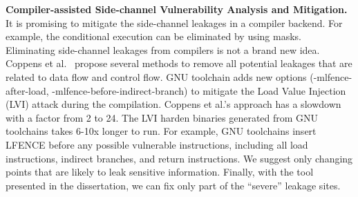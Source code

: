 \textbf{Compiler-assisted Side-channel Vulnerability Analysis and Mitigation.}
It is promising to mitigate the side-channel leakages in a compiler backend. For example, the conditional execution can be eliminated by using masks. Eliminating side-channel leakages from compilers is not a brand new idea. Coppens et al.~\cite{Coppens:2009:PMT:1607723.1608124} propose several methods to remove all potential leakages that are related to data flow and control flow.  GNU toolchain adds new options (\textsf{-mlfence-after-load}, \textsf{-mlfence-before-indirect-branch}) to mitigate the Load Value Injection (LVI) attack during the compilation. Coppens et al.'s approach has a slowdown with a factor from 2 to 24. The LVI harden binaries generated from GNU toolchains takes 6-10x longer to run.  For example, GNU toolchains insert LFENCE before any possible vulnerable instructions, including all load instructions, indirect branches, and return instructions. We suggest only changing points that are likely to leak sensitive information. Finally, with the tool presented in the dissertation, we can fix only part of the ``severe'' leakage sites.